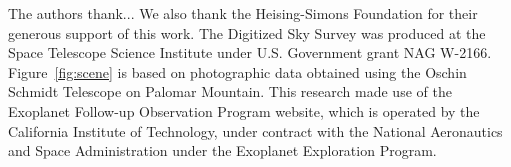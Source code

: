 \documentclass[12pt,twocolumn,tighten]{aastex62}
\begin{document}
\acknowledgements
%
%
%
The authors thank...
%
We also thank the Heising-Simons Foundation for
their generous support of this work.
%
The Digitized Sky Survey was produced at the Space Telescope Science
Institute under U.S. Government grant NAG W-2166.
Figure~\ref{fig:scene} is based on photographic data obtained using
the Oschin Schmidt Telescope on Palomar Mountain.
%
This research made use of the Exoplanet Follow-up Observation
Program website, which is operated by the California Institute of
Technology, under contract with the National Aeronautics and Space
Administration under the Exoplanet Exploration Program.
%
%
%
%
%
\end{document}
